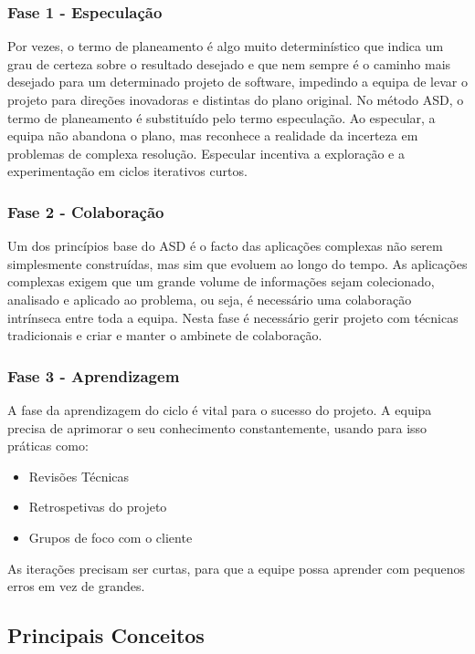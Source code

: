 \subsubsection{Fase 1 - Especulação}

Por vezes, o termo de planeamento é algo muito determinístico que indica um grau de certeza sobre o resultado desejado e que nem sempre é o caminho mais desejado para um determinado projeto de software, impedindo a equipa de levar o projeto para direções inovadoras e distintas do plano original.
No método ASD, o termo de planeamento é substituído pelo termo especulação. Ao especular, a equipa não abandona o plano, mas reconhece a realidade da incerteza em problemas de complexa resolução. Especular incentiva a exploração e a experimentação em ciclos iterativos curtos.

\subsubsection{Fase 2 - Colaboração}

Um dos princípios base do ASD é o facto das aplicações complexas não serem simplesmente construídas, mas sim que evoluem ao longo do tempo. As aplicações complexas exigem que um grande volume de informações sejam colecionado, analisado e aplicado ao problema, ou seja, é necessário uma colaboração intrínseca entre toda a equipa. Nesta fase é necessário gerir projeto com técnicas tradicionais e criar e manter o ambinete de colaboração.

\subsubsection{Fase 3 - Aprendizagem}

A fase da aprendizagem do ciclo é vital para o sucesso do projeto. A equipa precisa de aprimorar o seu conhecimento constantemente, usando para isso práticas como:

\begin{itemize}
    \item Revisões Técnicas
    \item Retrospetivas do projeto
    \item Grupos de foco com o cliente
\end{itemize}

As iterações precisam ser curtas, para que a equipe possa aprender com pequenos erros em vez de grandes.


\subsection{Principais Conceitos}

